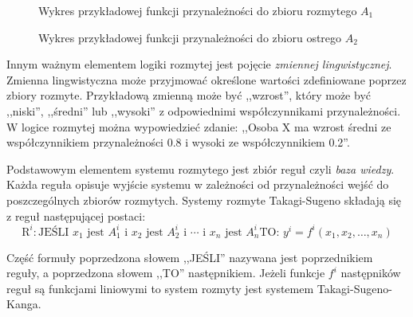 \documentclass[a4paper,12pt,titlepage]{article}
\begin{document}
\begin{figure}[h]
\centering
\caption{Wykres przykładowej funkcji przynależności do zbioru rozmytego $A_1$}
\label{2-ex1}
\end{figure}

\begin{figure}[h]
\centering
\caption{Wykres przykładowej funkcji przynależności do zbioru ostrego $A_2$}
\label{2-ex2}
\end{figure}

Innym ważnym elementem logiki rozmytej jest pojęcie \textit{zmiennej lingwistycznej}. Zmienna lingwistyczna może przyjmować określone wartości zdefiniowane poprzez zbiory rozmyte. Przykładową zmienną może być ,,wzrost'', który może być ,,niski'', ,,średni'' lub ,,wysoki'' z odpowiednimi współczynnikami przynależności. W logice rozmytej można wypowiedzieć zdanie: ,,Osoba X ma wzrost średni ze współczynnikiem przynależności 0.8 i wysoki ze współczynnikiem 0.2''.

Podstawowym elementem systemu rozmytego jest zbiór reguł czyli \textit{baza wiedzy}. Każda reguła opisuje wyjście systemu w zależności od przynależności wejść do poszczególnych zbiorów rozmytych. Systemy rozmyte Takagi-Sugeno składają się z reguł następującej postaci:
\begin{equation}
\mathrm{R}^i:\mbox{JEŚLI $x_1$ jest $A_1^i$ i $x_2$ jest $A_2^i$ i $\cdots$ i $x_n$ jest $A_n^i$}
\mbox{TO: $y^i=f^i(x_1, x_2, \ldots , x_n)$} 
\label{reguly}
\end{equation}

Część formuły poprzedzona słowem ,,JEŚLI'' nazywana jest poprzednikiem reguły, a poprzedzona słowem ,,TO'' następnikiem. Jeżeli funkcje $f^i$ następników reguł są funkcjami liniowymi to system rozmyty jest systemem Takagi-Sugeno-Kanga.
\end{document}
